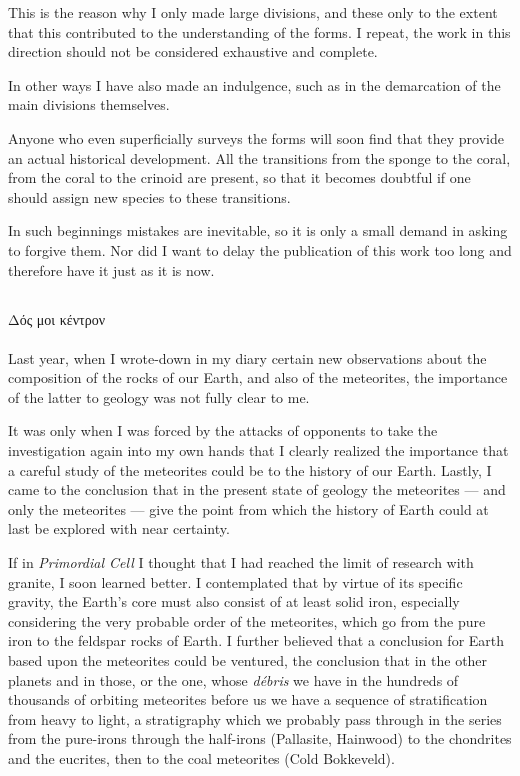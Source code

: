 \documentclass[a4paper, 12pt, oneside]{article}
\begin{document}
This is the reason why I only made large divisions, and these only to the extent that this contributed to the understanding of the forms. I repeat, the work in this direction should not be considered exhaustive and complete.

In other ways I have also made an indulgence, such as in the demarcation of the main divisions themselves.

Anyone who even superficially surveys the forms will soon find that they provide an actual historical development. All the transitions from the sponge to the coral, from the coral to the crinoid are present, so that it becomes doubtful if one should assign new species to these transitions.

In such beginnings mistakes are inevitable, so it is only a small demand in asking to forgive them. Nor did I want to delay the publication of this work too long and therefore have it just as it is now.
\clearpage
\subsection{}
Δός μοι κέντρον%
\paragraph*{}
Last year, when I wrote-down in my diary certain new observations about the composition of the rocks of our Earth, and also of the meteorites, the importance of the latter to geology was not fully clear to me.

It was only when I was forced by the attacks of opponents to take the investigation again into my own hands that I clearly realized the importance that a careful study of the meteorites could be to the history of our Earth. Lastly, I came to the conclusion that in the present state of geology the meteorites --- and only the meteorites --- give the point from which the history of Earth could at last be explored with near certainty.

If in \emph{Primordial Cell} I thought that I had reached the limit of research with granite, I soon learned better. I contemplated that by virtue of its specific gravity, the Earth's core must also consist of at least solid iron, especially considering the very probable order of the meteorites, which go from the pure iron to the feldspar rocks of Earth. I further believed that a conclusion for Earth based upon the meteorites could be ventured, the conclusion that in the other planets and in those, or the one, whose \emph{débris} we have in the hundreds of thousands of orbiting meteorites before us we have a sequence of stratification from heavy to light, a stratigraphy which we probably pass through in the series from the pure-irons through the half-irons (Pallasite, Hainwood) to the chondrites and the eucrites, then to the coal meteorites (Cold Bokkeveld).
\end{document}
